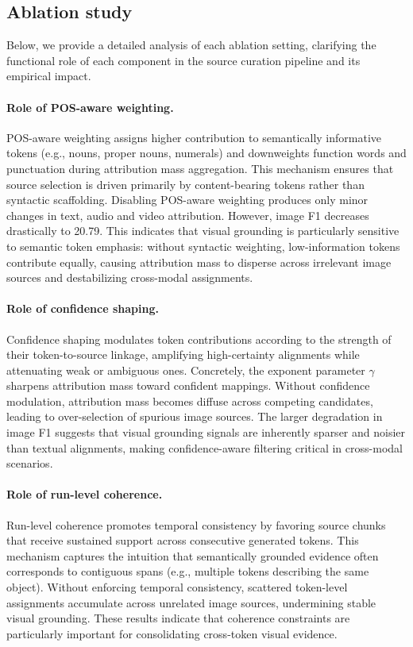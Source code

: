 \subsection{Ablation study}
\label{appendix:ablation_filtering}
Below, we provide a detailed analysis of each ablation setting, clarifying the functional role of each component in the source curation pipeline and its empirical impact.

\paragraph{Role of POS-aware weighting.}
POS-aware weighting assigns higher contribution to semantically informative tokens (e.g., nouns, proper nouns, numerals) and downweights function words and punctuation during attribution mass aggregation.
This mechanism ensures that source selection is driven primarily by content-bearing tokens rather than syntactic scaffolding.
Disabling POS-aware weighting produces only minor changes in text, audio and video attribution. However, image F1 decreases drastically to 20.79.
This indicates that visual grounding is particularly sensitive to semantic token emphasis: without syntactic weighting, low-information tokens contribute equally,
causing attribution mass to disperse across irrelevant image sources and destabilizing cross-modal assignments.

\paragraph{Role of confidence shaping.}
Confidence shaping modulates token contributions according to the strength of their token-to-source linkage, amplifying high-certainty alignments while attenuating weak or ambiguous ones.
Concretely, the exponent parameter $\gamma$ sharpens attribution mass toward confident mappings.
Without confidence modulation, attribution mass becomes diffuse across competing candidates, leading to over-selection of spurious image sources.
The larger degradation in image F1 suggests that visual grounding signals are inherently sparser and noisier than textual alignments,
making confidence-aware filtering critical in cross-modal scenarios.

\paragraph{Role of run-level coherence.}
Run-level coherence promotes temporal consistency by favoring source chunks that receive sustained support across consecutive generated tokens.
This mechanism captures the intuition that semantically grounded evidence often corresponds to contiguous spans (e.g., multiple tokens describing the same object).
Without enforcing temporal consistency, scattered token-level assignments accumulate across unrelated image sources, undermining stable visual grounding.
These results indicate that coherence constraints are particularly important for consolidating cross-token visual evidence.

